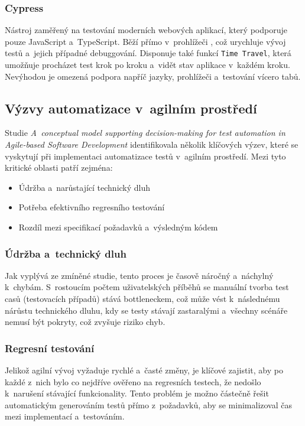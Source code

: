 \documentclass[czech, ing, kiv, he, iso690numb, viewonly]{fasthesis}
\begin{document}
\subsubsection*{Cypress}
Nástroj zaměřený na testování moderních webových aplikací, který podporuje pouze JavaScript a~TypeScript. Běží přímo v~prohlížeči \cite{cypress_docs}, což 
urychluje vývoj testů a~jejich případné debuggování. Disponuje také funkcí \texttt{Time Travel}, která umožňuje procházet test krok po kroku a~vidět stav aplikace v~každém kroku. 
Nevýhodou je omezená podpora napříč jazyky, prohlížeči a~testování vícero tabů.


\subsection{Výzvy automatizace v~agilním prostředí}

Studie \textit{A~conceptual model supporting decision-making for test automation in Agile-based Software Development} \cite{butt2023conceptual} identifikovala několik klíčových výzev, které
se vyskytují při implementaci automatizace testů v~agilním prostředí. 
Mezi tyto kritické oblasti patří zejména:

\begin{itemize}
    \item Údržba a~narůstající technický dluh
    \item Potřeba efektivního regresního testování
    \item Rozdíl mezi specifikací požadavků a~výsledným kódem
\end{itemize}

\subsubsection*{Údržba a~technický dluh}
Jak vyplývá ze zmíněné studie, tento proces je časově náročný a~náchylný k~chybám. S~rostoucím počtem uživatelských příběhů se manuální tvorba 
test casů (testovacích případů) stává bottleneckem, což může vést k~následnému nárůstu technického dluhu, kdy se testy stávají zastaralými a~všechny 
scénáře nemusí být pokryty, což zvyšuje riziko chyb. 


\subsubsection*{Regresní testování}
Jelikož agilní vývoj vyžaduje rychlé a~časté změny, je klíčové zajistit, aby po každé z~nich bylo co nejdříve ověřeno na regresních testech, 
že nedošlo k~narušení stávající funkcionality. Tento problém je možno částečně řešit automatickým generováním testů přímo z~požadavků, aby se 
minimalizoval čas mezi implementací a~testováním.
\end{document}
